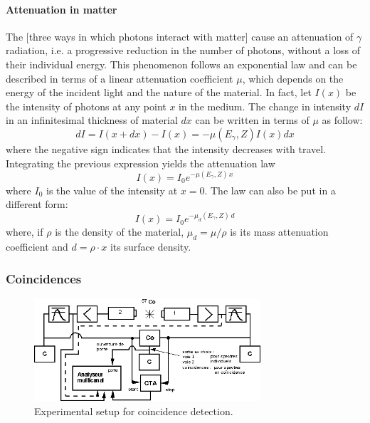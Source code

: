 \paragraph{Attenuation in matter}
The [three ways in which photons interact with matter] cause an attenuation of $\gamma$ radiation, i.e. a progressive reduction in the number of photons, without a loss of their individual energy.
This phenomenon follows an exponential law and can be described in terms of a linear attenuation coefficient $\mu$, which depends on the energy of the incident light and the nature of the material.
In fact, let $I(x)$ be the intensity of photons at any point $x$ in the medium.
The change in intensity $dI$ in an infinitesimal thickness of material $dx$ can be written in terms of $\mu$ as follow:
\begin{equation}
    dI = I(x + dx) - I(x) = -\mu(E_{\gamma}, Z) I(x) dx
\end{equation}
where the negative sign indicates that the intensity decreases with travel.
Integrating the previous expression yields the attenuation law
\begin{equation} \label{eq:attenuation_law}
    I(x) = I_0 e^{-\mu(E_{\gamma}, Z) \, x}
\end{equation}
where $I_0$ is the value of the intensity at $x=0$. 
The law can also be put in a different form:
\begin{equation} \label{eq:attenuation_law_density}
    I(x) = I_0 e^{-\mu_d(E_{\gamma}, Z) \, d}
\end{equation}
where, if $\rho$ is the density of the material, $\mu_d = \mu / \rho$ is its mass attenuation coefficient and $d = \rho \cdot x$ its surface density.

\subsubsection{Coincidences}
\begin{figure}[h]
    \centering
    \includegraphics[width=0.75\textwidth]{figures/coincidences.png}
    \caption{Experimental setup for coincidence detection. \cite{notice_VI}}
    \label{fig:setup_coincidences}
\end{figure}

